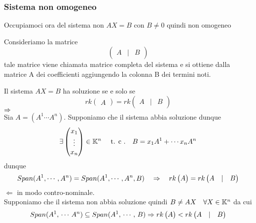 \subsubsection{Sistema non omogeneo}
Occupiamoci ora del sistema non $ AX=B$ con $ B \neq 0$ quindi non omogeneo
\begin{defn}
Consideriamo la matrice 
$$ 
\begin{pmatrix}
A  & \vert  & B 
\end{pmatrix}$$
tale matrice viene chiamata matrice completa del sistema e si ottiene dalla matrice A dei coefficienti aggiungendo la colonna B dei termini noti.
\end{defn}
\spazio 
\begin{prop} \bianco %
Il sistema $ AX=B$ ha soluzione se e solo se 
$$ rk \begin{pmatrix}
A
\end{pmatrix}= rk \begin{pmatrix}
A &  \vert & B 
\end{pmatrix}
$$
\proof $ \Rightarrow$ \\
Sia  $ A = ( A^1 \cdots A^n )$.
Supponiamo che il sistema abbia soluzione dunque
$$ \exists \begin{pmatrix} x_1 \\ \vdots \\ x_n  \end{pmatrix}  \in \mathbb{K}^n\quad \text{ t. c .} \quad B = x_1 A^1 + \cdots x_n A^n$$ dunque
$$Span ( A^1, \cdots , A^n ) = Span ( A^1, \cdots , A^n , B )  \quad \Rightarrow \quad rk \begin{pmatrix}
A
\end{pmatrix}= rk \begin{pmatrix}
A &  \vert & B 
\end{pmatrix}$$
 $\Leftarrow$ in modo contro-nominale.\\
Supponiamo che il sistema non abbia soluzione quindi $ B \neq AX \quad \forall X\in \mathbb{K} ^n $ da cui
$$ Span ( A^1, \, \cdots \, A^n ) \subseteq Span ( A^1 , \, \cdots , \, B ) \Rightarrow rk \begin{pmatrix}
A
\end{pmatrix}<  rk \begin{pmatrix}
A &  \vert & B 
\end{pmatrix}$$
\endproof 
\end{prop}
